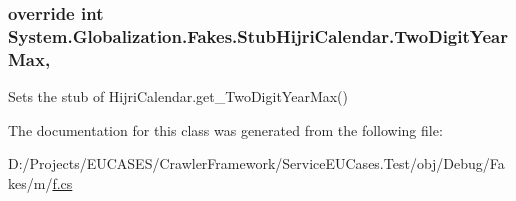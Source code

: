 \hypertarget{class_system_1_1_globalization_1_1_fakes_1_1_stub_hijri_calendar_abc56824fe0276e40a858128186b6e780}{
\subsubsection[{Two\-Digit\-Year\-Max}]{\setlength{\rightskip}{0pt plus 5cm}override int System.\-Globalization.\-Fakes.\-Stub\-Hijri\-Calendar.\-Two\-Digit\-Year\-Max\hspace{0.3cm}{\ttfamily [get]}, {\ttfamily [set]}}}\label{class_system_1_1_globalization_1_1_fakes_1_1_stub_hijri_calendar_abc56824fe0276e40a858128186b6e780}


Sets the stub of Hijri\-Calendar.\-get\-\_\-\-Two\-Digit\-Year\-Max()



The documentation for this class was generated from the following file\-:\begin{DoxyCompactItemize}
\item 
D\-:/\-Projects/\-E\-U\-C\-A\-S\-E\-S/\-Crawler\-Framework/\-Service\-E\-U\-Cases.\-Test/obj/\-Debug/\-Fakes/m/\hyperlink{m_2f_8cs}{f.\-cs}\end{DoxyCompactItemize}
